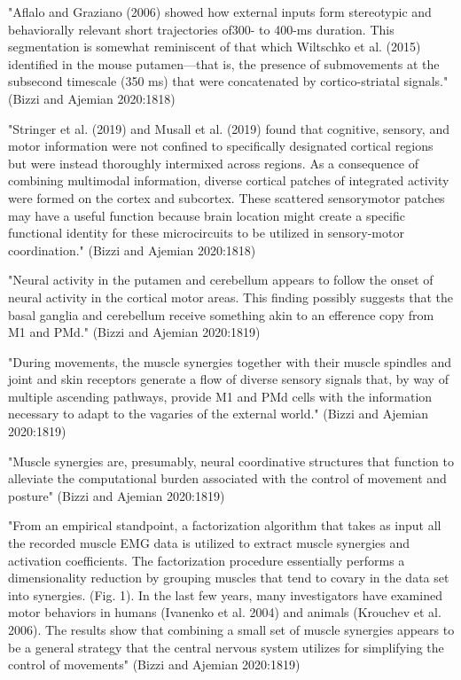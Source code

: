 \documentclass[../main.tex]{subfiles}
\begin{document}
{{"Aflalo and Graziano (2006) showed how external inputs form stereotypic and behaviorally relevant short trajectories of300- to 400-ms duration. This segmentation is somewhat reminiscent of that which Wiltschko et al. (2015) identified in the mouse putamen—that is, the presence of submovements at the subsecond timescale (350 ms) that were concatenated by cortico-striatal signals." (Bizzi and Ajemian 2020:1818)

"Stringer et al. (2019) and Musall et al. (2019) found that cognitive, sensory, and motor information were not confined to specifically designated cortical regions but were instead thoroughly intermixed across regions. As a consequence of combining multimodal information, diverse cortical patches of integrated activity were formed on the cortex and subcortex. These scattered sensorymotor patches may have a useful function because brain location might create a specific functional identity for these microcircuits to be utilized in sensory-motor coordination." (Bizzi and Ajemian 2020:1818)

"Neural activity in the putamen and cerebellum appears to follow the onset of neural activity in the cortical motor areas. This finding possibly suggests that the basal ganglia and cerebellum receive something akin to an efference copy from M1 and PMd." (Bizzi and Ajemian 2020:1819)

"During movements, the muscle synergies together with their muscle spindles and joint and skin receptors generate a flow of diverse sensory signals that, by way of multiple ascending pathways, provide M1 and PMd cells with the information necessary to adapt to the vagaries of the external world." (Bizzi and Ajemian 2020:1819)

"Muscle synergies are, presumably, neural coordinative structures that function to alleviate the computational burden associated with the control of movement and posture" (Bizzi and Ajemian 2020:1819)

"From an empirical standpoint, a factorization algorithm that takes as input all the recorded muscle EMG data is utilized to extract muscle synergies and activation coefficients. The factorization procedure essentially performs a dimensionality reduction by grouping muscles that tend to covary in the data set into synergies. (Fig. 1). In the last few years, many investigators have examined motor behaviors in humans (Ivanenko et al. 2004) and animals (Krouchev et al. 2006). The results show that combining a small set of muscle synergies appears to be a general strategy that the central nervous system utilizes for simplifying the control of movements" (Bizzi and Ajemian 2020:1819)

}}
\end{document}
